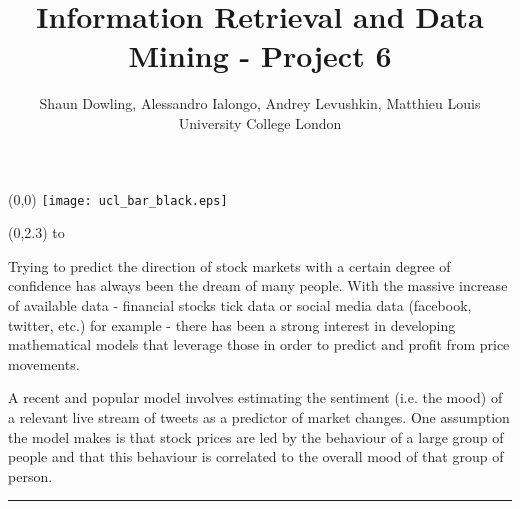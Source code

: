 \documentclass[a0]{a0poster}
\title{Information Retrieval and Data Mining - Project 6}
\author{Shaun Dowling, Alessandro Ialongo, Andrey Levushkin, Matthieu Louis\\ University College London}
\def\Head#1{\noindent\hbox to \hsize{\hfil{\LARGE\color{DarkBlue}\sf #1}}\bigskip}
\begin{document}
\begin{textblock}{23}(0,0)
\vspace*{-48mm}\hspace*{-42mm}%
\texttt{[image: ucl\_bar\_black.eps]}
\begin{minipage}{1191mm}		%
\vspace{-20cm}
\maketitle
\end{minipage}
\end{textblock}


\begin{textblock}{7}(0,2.3)
\Head{Introduction}

\sf %
Trying to predict the direction of stock markets with a certain degree of confidence has always been the dream of many people. With the massive increase of available data - financial stocks tick data or social media data (facebook, twitter, etc.) for example - there has been a strong interest in developing mathematical models that leverage those in order to predict and profit from price movements.

A recent and popular model involves estimating the sentiment (i.e. the mood) of a relevant live stream of tweets as a predictor of market changes. One assumption the model makes is that stock prices are led by the behaviour of a large group of people and that this behaviour is correlated to the overall mood of that group of person.


\bigskip
\hrule
\end{textblock}
\end{document}
